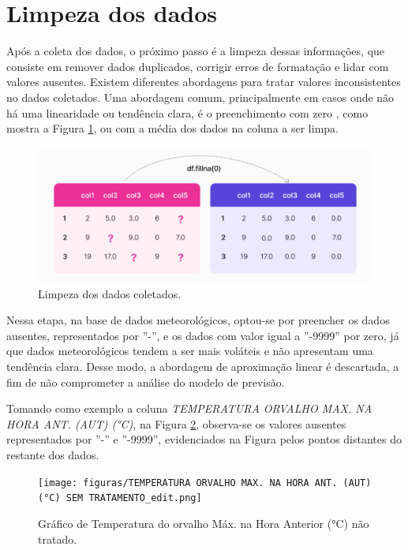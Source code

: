 \section{Limpeza dos dados}
\label{sec:limpeza_dos_dados}

Após a coleta dos dados, o próximo passo é a limpeza dessas informações, que consiste em remover dados duplicados, corrigir erros de formatação e lidar com valores ausentes. Existem diferentes abordagens para tratar valores inconsistentes no dados coletados. Uma abordagem comum, principalmente em casos onde não há uma linearidade ou tendência clara, é o preenchimento com zero \cite{cousineau2010outliers}, como mostra a Figura \ref{fig:passo_dados_limpeza}, ou com a média dos dados na coluna a ser limpa.

\begin{figure}[H]
	\caption{\label{fig:passo_dados_limpeza}Limpeza dos dados coletados.}
	\begin{center}
		\includegraphics[scale=0.35]{figuras/step_data_cleaning.png}
	\end{center}
\end{figure}

Nessa etapa, na base de dados meteorológicos, optou-se por preencher os dados ausentes, representados por ''-'', e os dados com valor igual a ''-9999'' por zero, já que dados meteorológicos tendem a ser mais voláteis e não apresentam uma tendência clara. Desse modo, a abordagem de aproximação linear é descartada, a fim de não comprometer a análise do modelo de previsão.  

Tomando como exemplo a coluna \textit{TEMPERATURA ORVALHO MAX. NA HORA ANT. (AUT) (°C)}, na Figura \ref{fig:dados_clima_poa_nao_tratados}, observa-se os valores ausentes representados por ''-'' e ''-9999'', evidenciados na Figura pelos pontos distantes do restante dos dados.

\begin{figure}[H]
	\caption{\label{fig:dados_clima_poa_nao_tratados}Gráfico de Temperatura do orvalho Máx. na Hora Anterior (°C) não tratado.}
	\begin{center}
		\texttt{[image: figuras/TEMPERATURA ORVALHO MAX. NA HORA ANT. (AUT) (°C) SEM TRATAMENTO\_edit.png]}
	\end{center}
\end{figure}

